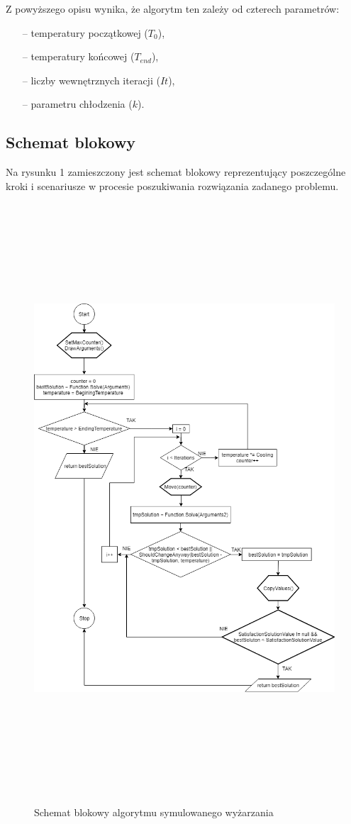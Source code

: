 \documentclass[twoside]{projektInzynierskiMS1}
\begin{document}
Z powyższego opisu wynika, że algorytm ten zależy od czterech parametrów:
\begin{itemize}
	\item[--] temperatury początkowej ($T_0$),
	\item[--] temperatury końcowej ($T_{end}$),
	\item[--] liczby wewnętrznych iteracji ($It$),
	\item[--] parametru chłodzenia ($k$).
\end{itemize}

\subsection{Schemat blokowy}
Na rysunku 1 zamieszczony jest schemat blokowy reprezentujący poszczególne kroki i scenariusze w procesie poszukiwania rozwiązania zadanego problemu.

\begin{figure}[H]
		\includegraphics[height=22cm, width=16cm]{pics/blockDiagram.png}\\
	\caption{Schemat blokowy algorytmu symulowanego wyżarzania}
\end{figure}
\end{document}
